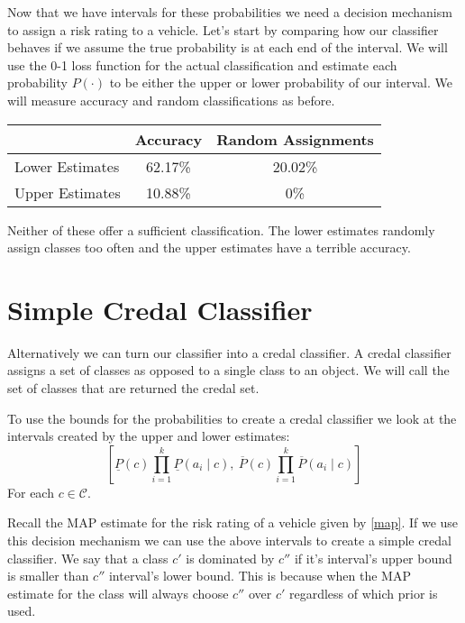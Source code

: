 Now that we have intervals for these probabilities we need a decision mechanism to assign a risk rating to a vehicle.
Let's start by comparing how our classifier behaves if we assume the true probability is at each end of the interval.
We will use the 0-1 loss function for the actual classification and estimate each probability $P(\cdot)$ to be either the upper or lower probability of our interval.
We will measure accuracy and random classifications as before.

\begin{center}
	\begin{tabular}{l|c c}
	                & Accuracy & Random Assignments \\
	\hline
	Lower Estimates & 62.17\%  & 20.02\%            \\
	Upper Estimates & 10.88\%  & 0\%                \\
	\end{tabular}
\end{center}

Neither of these offer a sufficient classification.
The lower estimates randomly assign classes too often and the upper estimates have a terrible accuracy.

\section{Simple Credal Classifier}

Alternatively we can turn our classifier into a credal classifier.
A credal classifier assigns a set of classes as opposed to a single class to an object.
We will call the set of classes that are returned the credal set.

To use the bounds for the probabilities to create a credal classifier we look at the intervals created by the upper and lower estimates:
\begin{equation}
	\left[ \underline{P}(c)\prod_{i=1}^k \underline{P}(a_i \mid c), \ \overline{P}(c)\prod_{i=1}^k \overline{P}(a_i \mid c) \right]
\end{equation}
For each $c \in \mathcal{C}$.

Recall the MAP estimate for the risk rating of a vehicle given by \cref{map}.
If we use this decision mechanism we can use the above intervals to create a simple credal classifier.
We say that a class $c'$ is dominated by $c''$ if it's interval's upper bound is smaller than $c''$ interval's lower bound.
This is because when the MAP estimate for the class will always choose $c''$ over $c'$ regardless of which prior is used.

